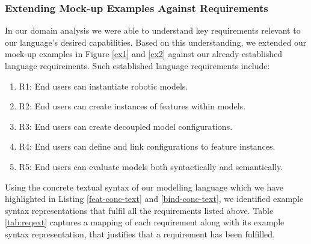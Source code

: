 \documentclass[conference]{IEEEtran}
\begin{document}
\subsubsection{Extending Mock-up Examples Against Requirements}
In our domain analysis we were able to understand key requirements relevant to our language's desired capabilities. Based on this understanding, we extended our mock-up examples in Figure \ref{ex1} and \ref{ex2} against our already established language requirements. Such established language requirements include:
\begin{enumerate}
    \item R1: End users can instantiate robotic models.
    \item R2: End users can create instances of features within models.
    \item R3: End users can create decoupled model configurations.
    \item R4: End users can define and link configurations to feature instances.
    \item R5: End users can evaluate models both syntactically and semantically.
\end{enumerate}
Using the concrete textual syntax of our modelling language which we have highlighted in Listing \ref{feat-conc-text} and \ref{bind-conc-text}, we identified example syntax representations that fulfil all the requirements listed above. Table \ref{tab:reqext} captures a mapping of each requirement along with its example syntax representation, that justifies that a requirement has been fulfilled.
\end{document}
